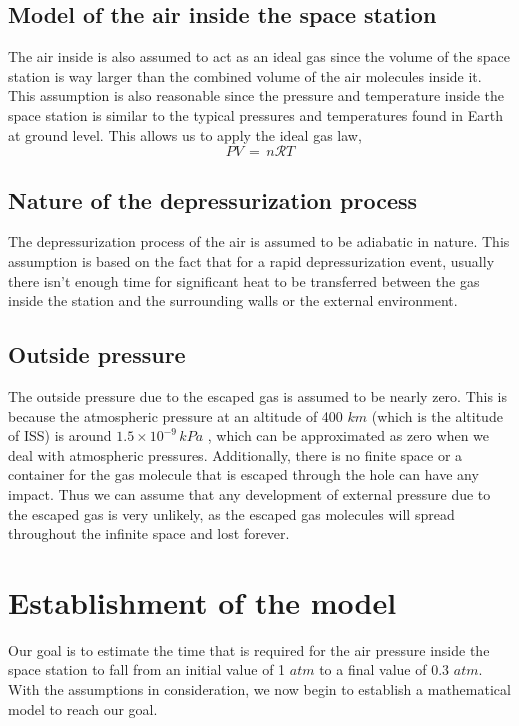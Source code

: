 \documentclass[a4paper, 14pt]{extarticle}
\begin{document}
\subsection{Model of the air inside the space station}
The air inside is also assumed to act as an ideal gas since the volume of the space station is way larger than the combined volume of the air molecules inside it. This assumption is also reasonable since the pressure and temperature inside the space station is similar to the typical pressures and temperatures found in Earth at ground level. This allows us to apply the ideal gas law, 
\[ PV \,=\, n\mathcal{R}T \]

\subsection{Nature of the depressurization process}
The depressurization process of the air is assumed to be adiabatic in nature. This assumption is based on the fact that for a rapid depressurization event, usually there isn’t enough time for significant heat to be transferred between the gas inside the station and the surrounding walls or the external environment.

\subsection{Outside pressure}
The outside pressure due to the escaped gas is assumed to be nearly zero. This is because the atmospheric pressure at an altitude of 400 $km$ (which is the altitude of ISS) is around $1.5 \times 10^{-9}\, kPa$ \citep{usgovt}, which can be approximated as zero when we deal with atmospheric pressures. Additionally, there is no finite space or a container for the gas molecule that is escaped through the hole can have any impact. Thus we can assume that any development of external pressure due to the escaped gas is very unlikely, as the escaped gas molecules will spread throughout the infinite space and lost forever.

\section{Establishment of the model}
Our goal is to estimate the time that is required for the air pressure inside the space station to fall from an initial value of 1 $atm$ to a final value of 0.3 $atm$. With the assumptions in consideration, we now begin to establish a mathematical model to reach our goal.
\end{document}
